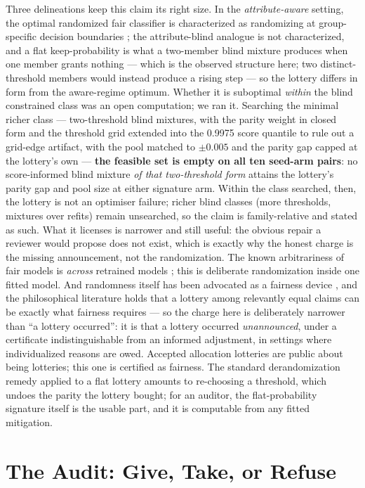 \documentclass[conference]{IEEEtran}
\begin{document}
Three delineations keep this claim its right size. In the \emph{attribute-aware} setting,
the optimal randomized fair classifier is characterized as randomizing at group-specific
decision boundaries \cite{agarwal2022}; the attribute-blind analogue is not characterized,
and a flat keep-probability is what a two-member blind mixture produces when one member
grants nothing --- which is the observed structure here; two distinct-threshold members
would instead produce a rising step --- so the lottery differs in form from the
aware-regime optimum. Whether it is
suboptimal \emph{within} the blind constrained class was an open computation; we ran
it. Searching the minimal richer class --- two-threshold blind mixtures, with the
parity weight in closed form and the threshold grid extended into the 0.9975 score
quantile to rule out a grid-edge artifact, with the pool matched to $\pm 0.005$ and the
parity gap capped at the lottery's own --- \textbf{the feasible set is empty on all
ten seed-arm pairs}: no score-informed blind mixture \emph{of that two-threshold form}
attains the lottery's parity gap and pool size at either signature arm. Within the
class searched, then, the lottery is not an optimiser failure; richer blind classes
(more thresholds, mixtures over refits) remain unsearched, so the claim is
family-relative and stated as such. What it licenses is narrower and still useful:
the obvious repair a reviewer would propose does not exist, which is exactly why the
honest charge is the missing announcement, not the randomization. The known
arbitrariness of fair models is \emph{across} retrained models \cite{long2023}; this is
deliberate randomization inside one fitted model. And randomness itself has been advocated
as a fairness device \cite{grgic2017}, and the philosophical literature holds that a
lottery among relevantly equal claims can be exactly what fairness requires
\cite{broome1990,stone2011} --- so the charge here is deliberately narrower than
``a lottery occurred'': it is that a lottery occurred \emph{unannounced}, under a
certificate indistinguishable from an informed adjustment, in settings where
individualized reasons are owed. Accepted allocation lotteries are public about being
lotteries; this one is certified as fairness. The standard derandomization remedy \cite{cotter2019} applied
to a flat lottery amounts to re-choosing a threshold, which undoes the parity the lottery
bought; for an auditor, the flat-probability signature itself is the usable part, and it
is computable from any fitted mitigation.

\section{The Audit: Give, Take, or Refuse}
\label{sec:procedure}
\end{document}
